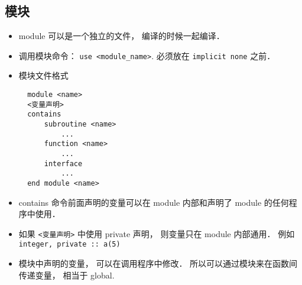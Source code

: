 \subsection{模块}

\begin{itemize}
\item module 可以是一个独立的文件， 编译的时候一起编译．
\item 调用模块命令：  \verb|use <module_name>|.  必须放在 \verb|implicit none| 之前．
\item 模块文件格式
\begin{lstlisting}
  module <name>
  <变量声明>
  contains
      subroutine <name>
          ...
      function <name>
          ...
      interface
          ...
  end module <name>
\end{lstlisting}
\item contains 命令前面声明的变量可以在 module 内部和声明了 module 的任何程序中使用．
\item 如果 \verb|<变量声明>| 中使用 private 声明， 则变量只在 module 内部通用． 例如
   \verb|integer, private :: a(5)|
\item 模块中声明的变量， 可以在调用程序中修改． 所以可以通过模块来在函数间传递变量， 相当于 global.
\end{itemize}

